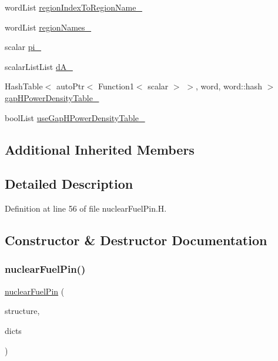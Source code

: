 \begin{DoxyCompactItemize}
\item 
word\+List \hyperlink{classFoam_1_1powerModels_1_1nuclearFuelPin_a639c2bc843a6948636eb5bf034616e53}{region\+Index\+To\+Region\+Name\+\_\+}
\item 
word\+List \hyperlink{classFoam_1_1powerModels_1_1nuclearFuelPin_aaee8da85bb053cffaafc054adea8673e}{region\+Names\+\_\+}
\item 
scalar \hyperlink{classFoam_1_1powerModels_1_1nuclearFuelPin_ad7683f85f3785b9444544d92fcfc3e1d}{pi\+\_\+}
\item 
scalar\+List\+List \hyperlink{classFoam_1_1powerModels_1_1nuclearFuelPin_a753fe594accfbeba343f55dfdf274a0f}{d\+A\+\_\+}
\item 
Hash\+Table$<$ auto\+Ptr$<$ Function1$<$ scalar $>$ $>$, word, word\+::hash $>$ \hyperlink{classFoam_1_1powerModels_1_1nuclearFuelPin_af3e43259f1e5ea73a5bb89f36d6cf584}{gap\+H\+Power\+Density\+Table\+\_\+}
\item 
bool\+List \hyperlink{classFoam_1_1powerModels_1_1nuclearFuelPin_a09a38dead56d361b78f3134ba95438a0}{use\+Gap\+H\+Power\+Density\+Table\+\_\+}
\end{DoxyCompactItemize}
\subsection*{Additional Inherited Members}


\subsection{Detailed Description}


Definition at line 56 of file nuclear\+Fuel\+Pin.\+H.



\subsection{Constructor \& Destructor Documentation}
\mbox{\label{classFoam_1_1powerModels_1_1nuclearFuelPin_a00a0807b8131c3860dc8ac801e00dc68}} 
\subsubsection{\texorpdfstring{nuclear\+Fuel\+Pin()}{nuclearFuelPin()}}
{\footnotesize\ttfamily \hyperlink{classFoam_1_1powerModels_1_1nuclearFuelPin}{nuclear\+Fuel\+Pin} (\begin{DoxyParamCaption}\item[{\hyperlink{classFoam_1_1structure}{structure} \&}]{structure,  }\item[{const dictionary \&}]{dicts }\end{DoxyParamCaption})}



